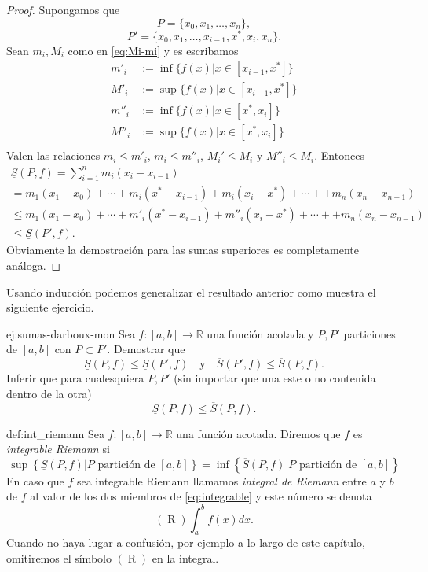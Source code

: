 \begin{proof} Supongamos que 
\[P=\{x_0,x_1,\ldots,x_n\},\]
\[P'=\{x_0,x_1,\ldots,x_{i-1},x^*,x_{i},x_n\}.\]
Sean $m_i,M_i$ como en \eqref{eq:Mi-mi} 
y es escribamos 
\[
 \begin{split}
    m'_i&:=\inf\{f(x)| x\in [x_{i-1},x^*]\}\\
    M'_i&:=\sup\{f(x)| x\in [x_{i-1},x^*]\}\\
    m''_i&:=\inf\{f(x)| x\in [x^*,x_i]\}\\
    M''_i&:=\sup\{f(x)| x\in [x^*,x_i]\}\\
 \end{split}
\]
 Valen las relaciones $m_i\leq m'_i$, $m_i\leq m''_i$, $M_i'\leq M_i$ y $M''_i\leq M_i$. Entonces
 \begin{multline*}
 \underline{S}(P,f)=\sum_{i=1}^nm_i(x_i-x_{i-1})\\=
 m_1(x_1-x_0)+\cdots+m_i(x^*-x_{i-1})+m_i(x_i-x^*)+\cdots++m_n(x_n-x_{n-1})\\
 \leq m_1(x_1-x_0)+\cdots+m'_i(x^*-x_{i-1})+m''_i(x_i-x^*)+\cdots++m_n(x_n-x_{n-1})\\
 \leq \underline{S}(P',f).
\end{multline*}
 Obviamente la demostración para las sumas superiores es completamente análoga.  
\end{proof}

Usando inducción podemos generalizar el resultado anterior como muestra el siguiente ejercicio.

\begin{ejercicio}{ej:sumas-darboux-mon} Sea $f:[a,b]\to\mathbb{R}$ una función acotada y $P,P'$ particiones de $[a,b]$ con $P\subset P'$. Demostrar que 
  \[
  \underline{S}(P,f)\leq \underline{S}(P',f)\quad\text{y}\quad \overline{S}(P',f)\leq \overline{S}(P,f).
 \]
 Inferir que para cualesquiera $P,P'$ (sin importar que una este o no contenida dentro de la otra)
   \[
\underline{S}(P,f)\leq \overline{S}(P,f).
 \]
 
\end{ejercicio}

\begin{definicion}{def:int_riemann} Sea $f:[a,b]\to\mathbb{R}$ una función acotada. Diremos que $f$ es {\em integrable Riemann}  si 
\begin{equation}\label{eq:integrable}
 \sup\left\{\underline{S}(P,f)| P \text{ partición de }[a,b]\right\}=\inf\left\{\overline{S}(P,f)| P \text{ partición de }[a,b]\right\}
\end{equation}
En caso que $f$ sea integrable Riemann llamamos {\em integral de Riemann}  entre $a$ y $b$ de $f$ al valor de los dos miembros de \eqref{eq:integrable} y este número se denota
\[
(\mathop{R})\int_a^bf(x)dx. 
\]
Cuando no haya lugar a confusión, por ejemplo a lo largo de este capítulo, omitiremos el símbolo $(\mathop{R})$ en la integral.
\end{definicion}




